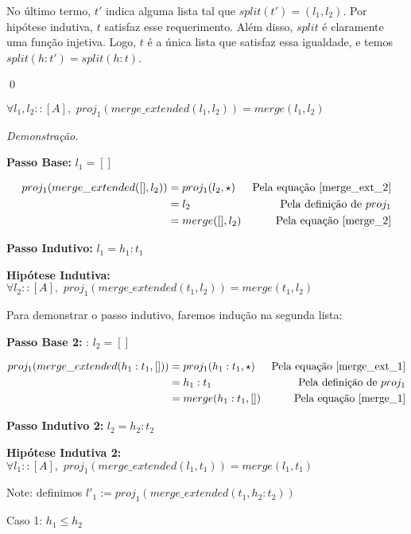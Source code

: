 \documentclass[12pt, oneside, a4paper,english,brazil]{abntex2}
\begin{document}
No \'ultimo termo, $t'$ indica alguma lista tal que $split(t') = (l_{1}, l_{2})$. Por hip\'otese indutiva, $t$ satisfaz esse requerimento. Al\'em disso, $split$ \'e claramente uma fun\c{c}\~ao injetiva. Logo, $t$ \'e a \'unica lista que satisfaz essa igualdade, e temos $split(h : t') = split(h : t)$.

\qed

\begin{teorema}
  $\forall l_{1}, l_{2} :: [A], \,\, proj_1(merge\_extended(l_{1}, l_{2})) = merge(l_{1}, l_{2})$
\end{teorema}

\noindent \textit{Demonstra\c{c}\~ao.}

\textbf{Passo Base: } $l_{1} = []$

\begin{align*}
  proj_{1}(merge\_extended([], l_{2})) &= proj_{1}(l_{2}, \star) &\text{Pela equa\c{c}\~ao \ref{merge_ext_2}} \\
  &= l_{2} &\text{Pela defini\c{c}\~ao de } proj_1\\
  &= merge([], l_{2}) &\text{Pela equa\c{c}\~ao \ref{merge_2}}
\end{align*}

\textbf{Passo Indutivo: } $l_{1} = h_{1} : t_{1}$

\textbf{Hip\'otese Indutiva: } $\forall l_{2} :: [A], \,\, proj_{1}(merge\_extended(t_{1}, l_{2})) = merge(t_{1}, l_{2})$

Para demonstrar o passo indutivo, faremos indu\c{c}\~ao na segunda lista:

\textbf{Passo Base 2: }: $l_{2} = []$

\begin{align*}
  proj_{1}(merge\_extended(h_{1} : t_{1}, [])) &= proj_{1}(h_{1} : t_{1}, \star) &\text{Pela equa\c{c}\~ao \ref{merge_ext_1}} \\
  &= h_{1} : t_{1} &\text{Pela defini\c{c}\~ao de } proj_1 \\
  &= merge(h_{1} : t_{1}, []) &\text{Pela equa\c{c}\~ao \ref{merge_1}}
\end{align*}

\textbf{Passo Indutivo 2: } $l_{2} = h_{2} : t_{2}$

\textbf{Hip\'otese Indutiva 2: } $\forall l_{1} :: [A], \,\, proj_{1}(merge\_extended(l_{1}, t_{1})) = merge(l_{1}, t_{1})$

Note: definimos $l'_{1} := proj_{1}(merge\_extended(t_{1}, h_{2} : t_{2}))$

Caso 1: $h_{1} \le h_{2}$\\
\end{document}

